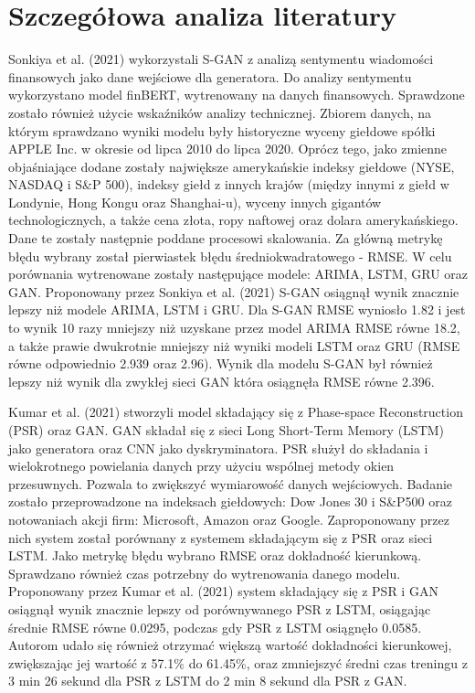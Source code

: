 \documentclass[review]{elsarticle} %
\begin{document}
\section{Szczegółowa analiza literatury}
Sonkiya et al. (2021) wykorzystali S-GAN z analizą sentymentu wiadomości finansowych jako dane wejściowe dla generatora. Do analizy sentymentu wykorzystano model finBERT, wytrenowany na danych finansowych. Sprawdzone zostało również użycie wskaźników analizy technicznej. Zbiorem danych, na którym sprawdzano wyniki modelu były historyczne wyceny giełdowe spółki APPLE Inc. w okresie od lipca 2010 do lipca 2020. Oprócz tego, jako zmienne objaśniające dodane zostały największe amerykańskie indeksy giełdowe (NYSE, NASDAQ i S\&P 500), indeksy giełd z innych krajów (między innymi z giełd w Londynie, Hong Kongu oraz Shanghai-u), wyceny innych gigantów technologicznych, a także cena złota, ropy naftowej oraz dolara amerykańskiego. Dane te zostały następnie poddane procesowi skalowania. Za główną metrykę błędu wybrany został pierwiastek błędu średniokwadratowego - RMSE. W celu porównania wytrenowane zostały następujące modele: ARIMA, LSTM, GRU oraz GAN. Proponowany przez Sonkiya et al. (2021) S-GAN osiągnął wynik znacznie lepszy niż modele ARIMA, LSTM i GRU. Dla S-GAN RMSE wyniosło 1.82 i jest to wynik 10 razy mniejszy niż uzyskane przez model ARIMA RMSE równe 18.2, a także prawie dwukrotnie mniejszy niż wyniki modeli LSTM oraz GRU (RMSE równe odpowiednio 2.939 oraz 2.96). Wynik dla modelu S-GAN był również lepszy niż wynik dla zwykłej sieci GAN która osiągnęła RMSE równe 2.396. 

 Kumar et al. (2021) stworzyli model składający się z Phase-space Reconstruction (PSR) oraz GAN. GAN składał się z sieci Long Short-Term Memory (LSTM) jako generatora oraz CNN jako dyskryminatora. PSR służył do składania i wielokrotnego powielania danych przy użyciu wspólnej metody okien przesuwnych. Pozwala to zwiększyć wymiarowość danych wejściowych. Badanie zostało przeprowadzone na indeksach giełdowych: Dow Jones 30 i S\&P500 oraz notowaniach akcji firm: Microsoft, Amazon oraz Google. Zaproponowany przez nich system został porównany z systemem składającym się z PSR oraz sieci LSTM. Jako metrykę błędu wybrano RMSE oraz dokładność kierunkową. Sprawdzano również czas potrzebny do wytrenowania danego modelu. Proponowany przez Kumar et al. (2021) system składający się z PSR i GAN osiągnął wynik znacznie lepszy od porównywanego PSR z LSTM, osiągając średnie RMSE równe 0.0295, podczas gdy PSR z LSTM osiągnęło 0.0585. Autorom udało się również otrzymać większą wartość dokładności kierunkowej, zwiększając jej wartość z 57.1\% do 61.45\%, oraz zmniejszyć średni czas treningu z 3 min 26 sekund dla PSR z LSTM do 2 min 8 sekund dla PSR z GAN.
\end{document}
